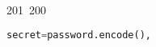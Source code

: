 201~200~\documentclass{article}
\begin{document}
\begin{lstlisting}[language=Python, caption=Hashing and Verifying Passwords with Argon2]
	                                                                                                                                                                                                                                                                                                	                                                                                                                                        	    	                                                                                                	                                                                                                                                                                                                                                                                                                                                	                                                                        	                                                                        	                                                                                                                                        	        secret=password.encode(),
	                                                                                                                                                                                                                                                                                                	                                                                                                                                        	    	                                                                                                	                                                                                                                                                                                                                                                                                                                                	                                                                        	                                                                        	                                                                                                                                        	                salt=salt,

\end{lstlisting}
\end{document}
